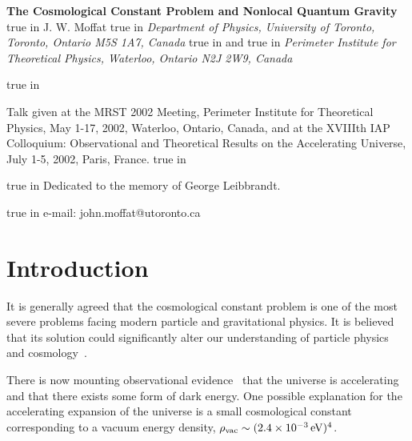 \documentclass[a4paper,12pt]{article}
\begin{document}
\pagestyle{plain}
\setcounter{page}{1}
\begin{center}
{\large\bf The Cosmological Constant Problem and Nonlocal Quantum Gravity}
 true in {\large J. W. Moffat}
 true in {\it Department of Physics, University of Toronto,
Toronto, Ontario M5S 1A7, Canada}
 true in and
 true
in {\it Perimeter Institute for Theoretical Physics, Waterloo, Ontario N2J
2W9, Canada}

\date{\today}
\begin{abstract}%
A nonlocal quantum gravity theory is presented which is finite and unitary
to all orders of perturbation theory. Vertex form factors in Feynman
diagrams involving gravitons suppress graviton and matter vacuum
fluctuation loops by introducing a low-energy gravitational scale,
$\Lambda_{\rm Gvac} < 2.4\times 10^{-3}$ eV. Gravitons coupled to
non-vacuum matter loops and matter tree graphs are controlled by a vertex
form factor with the energy scale, $\Lambda_{GM}< 1-10$ TeV. A satellite
E\"otv\"os experiment is proposed to test a violation of the equivalence
principle for coupling of gravitons to pure vacuum energy compared to
matter. \end{abstract}

 true in
\end{center}
Talk given at the MRST 2002 Meeting, Perimeter Institute for Theoretical
Physics, May 1-17, 2002, Waterloo, Ontario, Canada, and at the XVIIIth IAP
Colloquium: Observational and Theoretical Results on the Accelerating
Universe, July 1-5, 2002, Paris, France.
 true in

 true in
Dedicated to the memory of George Leibbrandt.

 true in
e-mail: john.moffat@utoronto.ca


\section{\bf Introduction}

It is generally agreed that the cosmological constant problem is
one of the most severe problems facing modern particle and gravitational
physics. It is believed that its solution could significantly alter our
understanding of particle physics and cosmology~\cite{Straumann}.

There is now mounting observational evidence~\cite{Perlmutter} that
the universe is accelerating and that there exists some form of dark
energy. One possible explanation for the accelerating expansion of the
universe is a small cosmological constant corresponding to a vacuum energy
density, $\rho_{\rm vac} \sim (2.4\times 10^{-3}\,{\rm eV})^4$.
\end{document}
